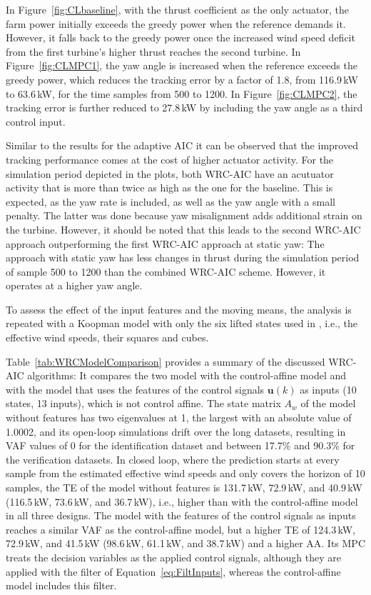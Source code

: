 In Figure~\ref{fig:CLbaseline}, with the thrust coefficient as the only actuator, the farm power initially exceeds the greedy power when the reference demands it. However, it falls back to the greedy power once the increased wind speed deficit from the first turbine's higher thrust reaches the second turbine. In Figure~\ref{fig:CLMPC1}, the yaw angle is increased when the reference exceeds the greedy power, which reduces the tracking error by a factor of 1.8, from 116.9\,kW to 63.6\,kW, for the time samples from 500 to 1200. 
In Figure~\ref{fig:CLMPC2}, the tracking error is further reduced to 27.8\,kW by including the yaw angle as a third control input. 

Similar to the results for the adaptive AIC it can be observed that the improved tracking performance comes at the cost of higher actuator activity. For the simulation period depicted in the plots, both WRC-AIC have an acutuator activity that is more than twice as high as the one for the baseline. This is expected, as the yaw rate is included, as well as the yaw angle with a small penalty. The latter was done because yaw misalignment adds additional strain on the turbine. However, it should be noted that this leads to the second WRC-AIC approach outperforming the first WRC-AIC approach at static yaw: The approach with static yaw has less changes in thrust during the simulation period of sample 500 to 1200 than the combined WRC-AIC scheme. However, it operates at a higher yaw angle.

To assess the effect of the input features and the moving means, the analysis is repeated with a Koopman model with only the six lifted states used in \cite{dittmer2023koopman}, i.e., the effective wind speeds, their squares and cubes.


 Table~\ref{tab:WRCModelComparison} provides a summary of the discussed WRC-AIC algorithms: It  compares the two model with the control-affine model and with the model that uses the features of the control signals $\bm{u}(k)$ as inputs (10 states, 13 inputs), which is not control affine. The state matrix $A_w$ of the model without features has two eigenvalues at 1, the largest with an absolute value of 1.0002, and its open-loop simulations drift over the long datasets, resulting in VAF values of 0 for the identification dataset and between 17.7\% and 90.3\% for the verification datasets. In closed loop, where the prediction starts at every sample from the estimated effective wind speeds and only covers the horizon of 10 samples, the TE of the model without features is 131.7\,kW, 72.9\,kW, and 40.9\,kW (116.5\,kW, 73.6\,kW, and 36.7\,kW), i.e., higher than with the control-affine model in all three designs. The model with the features of the control signals as inputs reaches a similar VAF as the control-affine model, but a higher TE of 124.3\,kW, 72.9\,kW, and 41.5\,kW (98.6\,kW, 61.1\,kW, and 38.7\,kW) and a higher AA. Its MPC treats the decision variables as the applied control signals, although they are applied with the filter of Equation~\eqref{eq:FiltInputs}, whereas the control-affine model includes this filter.

